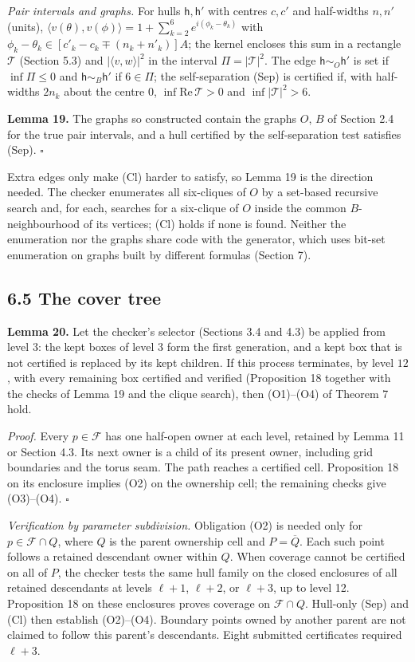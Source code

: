 \documentclass[
  11pt,
]{article}
\newcounter{none} %
\begin{document}
\emph{Pair intervals and graphs.} For hulls \(\mathsf h,\mathsf h'\)
with centres \(c,c'\) and half-widths \(n,n'\) (units),
\(\langle v(\theta),v(\phi)\rangle=1+\sum_{k=2}^6e^{i(\phi_k-\theta_k)}\)
with \(\phi_k-\theta_k\in[c'_k-c_k\mp(n_k+n'_k)]A\); the kernel encloses
this sum in a rectangle \(\mathcal T\) (Section 5.3) and
\(|\langle v,w\rangle|^2\) in the interval \(\Pi=|\mathcal T|^2\). The
edge \(\mathsf h\sim_O\mathsf h'\) is set if \(\inf\Pi\le0\) and
\(\mathsf h\sim_B\mathsf h'\) if \(6\in\Pi\); the self-separation (Sep)
is certified if, with half-widths \(2n_k\) about the centre \(0\),
\(\inf\mathrm{Re}\,\mathcal T>0\) and \(\inf|\mathcal T|^2>6\).

\textbf{Lemma 19.} The graphs so constructed contain the graphs \(O\),
\(B\) of Section 2.4 for the true pair intervals, and a hull certified
by the self-separation test satisfies (Sep). \(\square\)

Extra edges only make (Cl) harder to satisfy, so Lemma 19 is the
direction needed. The checker enumerates all six-cliques of \(O\) by a
set-based recursive search and, for each, searches for a six-clique of
\(O\) inside the common \(B\)-neighbourhood of its vertices; (Cl) holds
if none is found. Neither the enumeration nor the graphs share code with
the generator, which uses bit-set enumeration on graphs built by
different formulas (Section 7).

\subsection{6.5 The cover tree}\label{the-cover-tree}

\textbf{Lemma 20.} Let the checker's selector (Sections 3.4 and 4.3) be
applied from level \(3\): the kept boxes of level \(3\) form the first
generation, and a kept box that is not certified is replaced by its kept
children. If this process terminates, by level \(12\), with every
remaining box certified and verified (Proposition 18 together with the
checks of Lemma 19 and the clique search), then (O1)--(O4) of Theorem 7
hold.

\emph{Proof.} Every \(p\in\mathcal F\) has one half-open owner at each
level, retained by Lemma 11 or Section 4.3. Its next owner is a child of
its present owner, including grid boundaries and the torus seam. The
path reaches a certified cell. Proposition 18 on its enclosure implies
(O2) on the ownership cell; the remaining checks give (O3)--(O4).
\(\square\)

\emph{Verification by parameter subdivision.} Obligation (O2) is needed
only for \(p\in\mathcal F\cap Q\), where \(Q\) is the parent ownership
cell and \(P=\overline Q\). Each such point follows a retained
descendant owner within \(Q\). When coverage cannot be certified on all
of \(P\), the checker tests the same hull family on the closed
enclosures of all retained descendants at levels \(\ell+1\), \(\ell+2\),
or \(\ell+3\), up to level 12. Proposition 18 on these enclosures proves
coverage on \(\mathcal F\cap Q\). Hull-only (Sep) and (Cl) then
establish (O2)--(O4). Boundary points owned by another parent are not
claimed to follow this parent's descendants. Eight submitted
certificates required \(\ell+3\).
\end{document}
